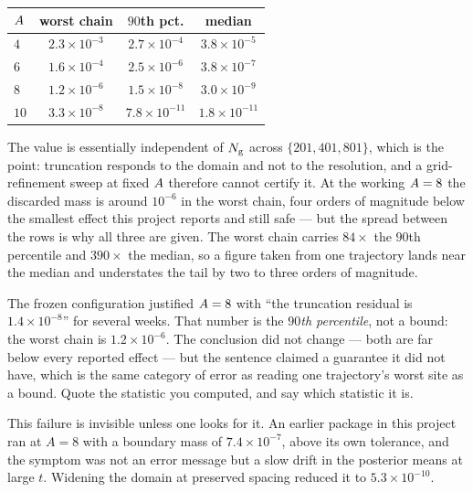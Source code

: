 \begin{center}
\footnotesize
\setlength{\tabcolsep}{4pt}
\begin{tabular}{@{}lccc@{}}
\toprule
$A$ & worst chain & $90$th pct. & median \\
\midrule
$4$  & $2.3\times10^{-3}$ & $2.7\times10^{-4}$  & $3.8\times10^{-5}$ \\
$6$  & $1.6\times10^{-4}$ & $2.5\times10^{-6}$  & $3.8\times10^{-7}$ \\
$8$  & $1.2\times10^{-6}$ & $1.5\times10^{-8}$  & $3.0\times10^{-9}$ \\
$10$ & $3.3\times10^{-8}$ & $7.8\times10^{-11}$ & $1.8\times10^{-11}$ \\
\bottomrule
\end{tabular}
\end{center}

\noindent
The value is essentially independent of $N_{\mathrm{g}}$ across $\{201,401,801\}$, which is the point:
truncation responds to the domain and not to the resolution, and a grid-refinement sweep at
fixed $A$ therefore cannot certify it. At the working $A=8$ the discarded mass
is around $10^{-6}$ in the worst chain, four orders of magnitude below the smallest effect this
project reports and still safe --- but the spread between the rows is why all three are given. The
worst chain carries $84\times$ the $90$th percentile and $390\times$ the median, so a figure taken
from one trajectory lands near the median and understates the tail by two to three orders of
magnitude.

\begin{pitfall}
The frozen configuration justified $A=8$ with ``the truncation residual is
$1.4\times10^{-8}$'' for several weeks. That number is the \emph{$90$th percentile}, not a bound:
the worst chain is $1.2\times10^{-6}$. The conclusion did not change --- both are far below every
reported effect --- but the sentence claimed a guarantee it did not have, which is the same
category of error as reading one trajectory's worst site as a bound. Quote the statistic you
computed, and say which statistic it is.
\end{pitfall}

\begin{pitfall}
This failure is invisible unless one looks for it. An earlier package in this project ran at
$A=8$ with a boundary mass of $7.4\times10^{-7}$, above its own tolerance, and the symptom was
not an error message but a slow drift in the posterior means at large $t$. Widening the domain
at preserved spacing reduced it to $5.3\times10^{-10}$.
\end{pitfall}

